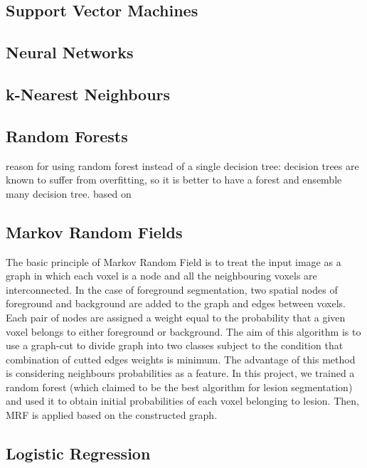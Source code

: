 \documentclass{article} %
\begin{document}
\subsection{Support Vector Machines}

\subsection{Neural Networks}

\subsection{k-Nearest Neighbours}

\subsection{Random Forests}
reason for using random forest instead of a single decision tree: decision trees are known to suffer from overfitting, so it is better to have a forest and ensemble many decision tree. based on \cite{geremia2011spatial}

\subsection{Markov Random Fields}
The basic principle of Markov Random Field is to treat the input image as a graph in which each voxel is a node and all the neighbouring voxels are interconnected. In the case of foreground segmentation, two spatial nodes of foreground and background are added to the graph and edges between voxels. Each pair of nodes are assigned a weight equal to the probability that a given voxel belongs to either foreground or background. The aim of this algorithm is to use a graph-cut to divide graph into two classes subject to the condition that combination of cutted edges weights is minimum. The advantage of this method is considering neighbours probabilities as a feature.
In this project, we trained a random forest (which claimed to be the best algorithm for lesion segmentation) and used it to obtain initial probabilities of each voxel belonging to lesion. Then, MRF is applied based on the constructed graph.

\subsection{Logistic Regression}

\end{document}
